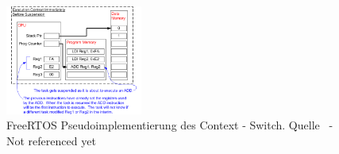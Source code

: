 \begin{figure}[ht!]
	\centering
		\includegraphics[width=0.4\textwidth]{Pictures/FreeRTOSOrg/ExeContext.png}
	\caption{FreeRTOS Pseudoimplementierung des Context - Switch. Quelle~\protect{} - Not referenced yet}
	\label{fig:FreeRTOSFsm}
	
\end{figure}

